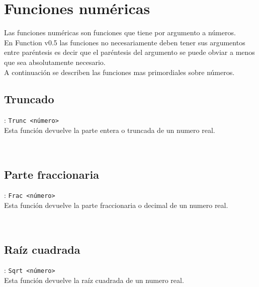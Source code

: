    \section{Funciones numéricas}
      Las funciones numéricas son funciones que tiene por argumento a números.
      \\
      
      En Function v0.5 las funciones no necesariamente deben tener sus argumentos entre paréntesis es decir que el paréntesis del argumento se puede obviar a menos que sea absolutamente necesario.
      \\
      
      A continuación se describen las funciones mas primordiales sobre números.
      
      \subsection*{Truncado}: \texttt{Trunc <número>}\\
      Esta función devuelve la parte entera o truncada de un numero real.
      
      \begin{fxcode}
         \\
      \end{fxcode}
      
      \subsection*{Parte fraccionaria}: \texttt{Frac <número>}\\
      Esta función devuelve la parte fraccionaria o decimal de un numero real.
      
      \begin{fxcode}
         \\
      \end{fxcode}
      
      \subsection*{Raíz cuadrada}: \texttt{Sqrt <número>}\\
      Esta función devuelve la raíz cuadrada de un numero real.
      
      \begin{fxcode}
         \\
      \end{fxcode}
      
